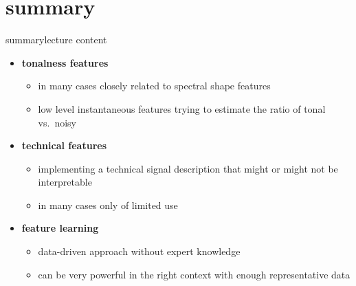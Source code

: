     \section{summary}
        \begin{frame}{summary}{lecture content}
            \begin{itemize}
                \item   \textbf{tonalness features}
                    \begin{itemize}
                        \item   in many cases closely related to spectral shape features
                        \item   low level instantaneous features trying to estimate the ratio of tonal vs.\ noisy
                    \end{itemize}
                \bigskip
                \item   \textbf{technical features}
                    \begin{itemize}
                        \item   implementing a technical signal description that might or might not be interpretable
                        \item   in many cases only of limited use
                    \end{itemize}
                \bigskip
                \item   \textbf{feature learning}
                    \begin{itemize}
                        \item   data-driven approach without expert knowledge
                        \item   can be very powerful in the right context with enough representative data
                    \end{itemize}
            \end{itemize}
        \end{frame}

